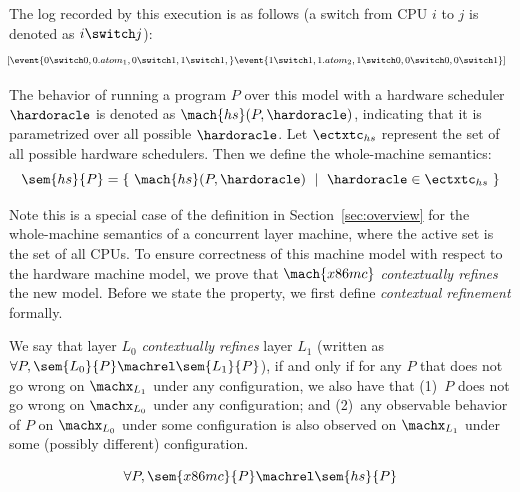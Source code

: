 \noindent
The log recorded by this execution is as follows
(a switch from CPU $i$ to $j$ is denoted as $i\switch j$):
\[
\begin{footnotesize}
\begin{array}{l}
\!\!\!\!\![\event{0\switch 0, 0.atom_1,  0\switch 1, 1\switch 1,}
\event{1\switch 1, 1.atom_2, 1\switch 0, 0\switch 0,  0\switch 1}]
\end{array}
\end{footnotesize}
\]

The behavior of running a program $P$ over this model with a hardware
scheduler $\hardoracle$ is denoted as $\mach{hs}(P,\hardoracle)$,
indicating that it is parametrized over all possible $\hardoracle$.
Let $\ectxtc_{hs}$ represent the set of all possible hardware
schedulers. Then we define the whole-machine semantics: 
\[
\sem{hs}{P} = \{ ~ \mach{hs}(P,\hardoracle) ~ \mid ~ \hardoracle \in \ectxtc_{hs} ~ \}
\]


\noindent
Note this is a special case of the definition in
Section~\ref{sec:overview} for the whole-machine semantics of a
concurrent layer machine, where the active set is the set of all CPUs.
To ensure correctness of this machine model with respect to the
hardware machine model, we prove that $\mach{x86mc}$
\emph{contextually refines} the new model.  Before we state the
property, we first define \emph{contextual refinement} formally.

\begin{definition}
\label{def:mach:refine}
We say that layer $L_0$ \emph{contextually refines} layer $L_1$
(written as $\forall P, \sem{L_0}{P}\machrel \sem{L_1}{P}$), if and
only if for any $P$ that does not go wrong on $\machx_{L_1}$ under any
configuration, we also have that (1)~$P$ does not go wrong on
$\machx_{L_0}$ under any configuration; and (2)~any observable
behavior of $P$ on $\machx_{L_0}$ under some configuration is also
observed on $\machx_{L_1}$ under some (possibly different)
configuration.
\end{definition}

\begin{lemma}
\label{lemma:hs}
\[\forall P, \sem{x86mc}{P}\machrel \sem{hs}{P}\]
\end{lemma}

